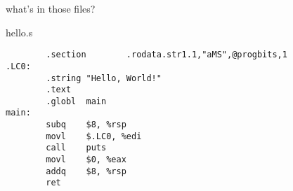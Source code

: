\begin{frame}[label=compPipe,fragile]{what's in those files?}
\end{frame}

\begin{frame}[fragile,label=realHelloS]{hello.s}
\begin{Verbatim}
        .section        .rodata.str1.1,"aMS",@progbits,1
.LC0:
        .string "Hello, World!"
        .text
        .globl  main
main:
        subq    $8, %rsp
        movl    $.LC0, %edi
        call    puts
        movl    $0, %eax
        addq    $8, %rsp
        ret
\end{Verbatim}
\end{frame}
